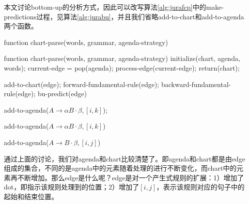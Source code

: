 \documentclass{article}
\begin{document}
\begin{CJK}{UTF8}{gbsn}
本文讨论bottom-up的分析方式，因此可以改写算法\ref{alg:jurafcp}中的make-predictions过程，见算法\ref{alg:jurabu}，并且我们省略add-to-chart和add-to-agenda两个函数。

\begin{algorithm}
\caption{function chart-parse(words, grammar, agenda-strategy)}
\begin{algorithmic}
\STATE function chart-parse(words, grammar, agenda-strategy)
\STATE initialize(chart, agenda, words);
\STATE current-edge = pop(agenda);
\STATE process-edge(current-edge);
\ENDWHILE
\STATE return(chart);
\end{algorithmic}

\vspace{1pc}
\begin{algorithmic}
\STATE add-to-chart(edge);
\STATE forward-fundamental-rule(edge);
\ELSE
\STATE backward-fundamental-rule(edge);
\STATE bu-predict(edge)
\ENDIF
\end{algorithmic}

\vspace{1pc}
\begin{algorithmic}
\STATE add-to-agenda($A\to \alpha B \cdot \beta,[i,k]$);
\ENDFOR
\end{algorithmic}

\vspace{1pc}
\begin{algorithmic}
\STATE add-to-agenda($A\to \alpha B \cdot \beta,[i,k]$)
\ENDFOR
\end{algorithmic}

\vspace{1pc}
\begin{algorithmic}
\STATE add-to-agenda($A\to B\cdot \beta,[i,j]$)
\ENDFOR
\end{algorithmic}
\label{alg:jurabu}
\end{algorithm}

通过上面的讨论，我们对agenda和chart比较清楚了。即agenda和chart都是由edge组成的集合，不同的是agenda中的元素随着处理的进行不断变化，而chart中的元素再不断增加。那么edge是什么呢？edge是对一个产生式规则的扩展：1）增加了dot，即指示该规则处理到的位置；2）增加了$[i,j]$，表示该规则对应的句子中的起始和结束位置。


\end{CJK}
\end{document}
